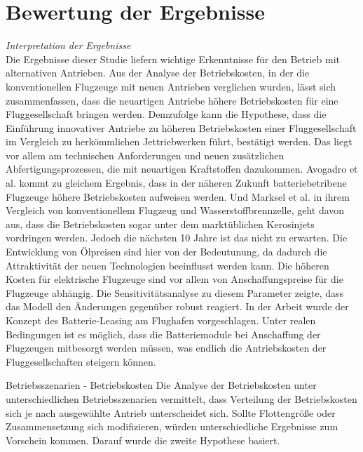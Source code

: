 
\section{Bewertung der Ergebnisse}
\label{s:Bewertung der Ergebnisse}

\textit{Interpretation der Ergebnisse}\\
Die Ergebnisse dieser Studie liefern wichtige Erkenntnisse für den Betrieb mit alternativen Antrieben.
Aus der Analyse der Betriebskosten, in der die konventionellen Flugzeuge mit neuen Antrieben verglichen wurden, 
lässt sich zusammenfassen, dass die neuartigen Antriebe höhere Betriebskosten für eine Fluggesellschaft bringen werden.
Demzufolge kann die Hypothese, dass die Einführung innovativer Antriebe zu höheren Betriebskosten einer Fluggesellschaft im Vergleich zu herkömmlichen
Jettriebwerken führt, bestätigt werden. Das liegt vor allem am technischen Anforderungen und neuen zusätzlichen Abfertigungsprozessen, die mit neuartigen
Kraftstoffen dazukommen. Avogadro et al.\cite{avogadro2024demystifying} kommt zu gleichem Ergebnis, 
dass in der näheren Zukunft batteriebetribene Flugzeuge höhere Betriebskosten aufweisen werden. Und Marksel et al. \cite{marksel2023comparative} in ihrem
Vergleich von konventionellem Flugzeug und Wasserstoffbrennzelle, geht davon aus, dass die Betriebskosten sogar unter dem marktüblichen Kerosinjets
vordringen werden. Jedoch die nächsten 10 Jahre ist das nicht zu erwarten. 
Die Entwicklung von Ölpreisen sind hier von der Bedeutunung, da dadurch die Attraktivität der neuen Technologien beeinflusst werden kann.
%
Die höheren Kosten für elektrische Flugzeuge sind vor allem von Anschaffungspreise für
die Flugzeuge abhängig. Die Sensitivitätsanalyse zu diesem Parameter zeigte, dass das Modell den Änderungen gegenüber robust reagiert.
In der Arbeit wurde der Konzept des Batterie-Leasing am Flughafen vorgeschlagen. Unter realen Bedingungen ist es möglich, 
dass die Batteriemodule bei Anschaffung der Flugzeugen mitbesorgt werden müssen, was endlich die Antriebskosten der Fluggesellschaften steigern
können. 


Betriebsszenarien - Betriebskosten
Die Analyse der Betriebskosten unter unterschiedlichen Betriebsszenarien vermittelt, dass Verteilung der Betriebskosten sich je nach
ausgewählte Antrieb unterscheidet sich. Sollte Flottengröße oder Zusammensetzung sich modifizieren, würden unterschiedliche Ergebnisse zum Vorschein kommen.
Darauf wurde die zweite Hypothese basiert. 

